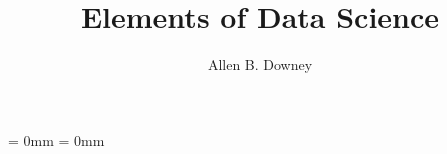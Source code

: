 \newcommand{\thetitle}{Elements of Data Science}
\newcommand{\thesubtitle}{}
\newcommand{\theauthors}{Allen B. Downey}
\newcommand{\theversion}{1.0.0}

\title{\thetitle}
\author{\theauthors}

\usepackage[T1]{fontenc}
\usepackage[utf8]{inputenc}
\usepackage{textcomp} %
\usepackage{amssymb,amsmath}
\usepackage[table]{xcolor}

\usepackage{roboto}







\usepackage{setspace}
\usepackage{graphicx}


\makeatletter
{}
\makeatother


\usepackage{bookmark}


\makeatletter
\def\fps@figure{h!}
\makeatother


\usepackage{makeidx}
\usepackage{upquote}
\usepackage[listings]{tcolorbox}
\newcommand{\passthrough}[1]{#1}


\usepackage{longtable}
\usepackage{booktabs}
\usepackage{calc}             %


\newcommand{\midsepremove}{\aboverulesep = 0mm
                           \belowrulesep = 0mm}
\midsepremove


